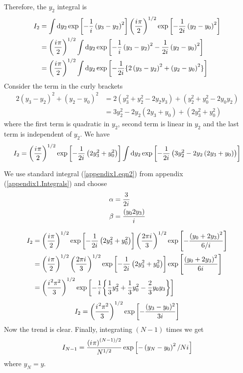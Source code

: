 	Therefore, the $y_2$ integral is
	\begin{align*}
		I_2 
		&= \int \dd{y_2} \exp \left[-\frac{1}{{i\mkern1mu}} \left(y_3 - y_2\right)^2\right] \left(\frac{{i\mkern1mu} \pi}{2}\right)^{1/2} \exp \left[-\frac{1}{2 {i\mkern1mu}} \left(y_2 - y_0\right)^2\right] \\
		&= \left(\frac{{i\mkern1mu} \pi}{2}\right)^{1/2} \int \dd{y_2} \exp \left[-\frac{1}{{i\mkern1mu}} \left(y_3 - y_2\right)^2 -\frac{1}{2 {i\mkern1mu}} \left(y_2 - y_0\right)^2\right] \\
		&= \left(\frac{{i\mkern1mu} \pi}{2}\right)^{1/2} \int \dd{y_2} \exp \left[-\frac{1}{2{i\mkern1mu}} \{2 \left(y_3 - y_2\right)^2 + \left(y_2 - y_0\right)^2\}\right] \\
	\end{align*}
	Consider the term in the curly brackets
	\begin{align*}
		2\left(y_3 - y_2\right)^2 + \left(y_2 - y_0\right)^2 &= 2\left(y_3^2 + y_2^2 - 2y_2 y_3\right) + \left(y_2^2 + y_0^2 - 2 y_0 y_2\right) \\
		&= 3 y_2^2 - 2y_2 \left(2y_3 + y_0\right) + \left(2 y_3^2 + y_0^2\right)
	\end{align*}
	where the first term is quadratic in $y_2$, second term is linear in $y_2$ and the last term is independent of $y_2$. We have
	\begin{equation}
		I_2 = \left(\frac{{i\mkern1mu} \pi}{2}\right)^{1/2} \exp\left[-\frac{1}{2{i\mkern1mu}}\left(2 y_3^2 + y_0^2\right)\right] \int \dd{y_2} \exp\left[-\frac{1}{2{i\mkern1mu}} \left(3 y_2^2 - 2y_2 \left(2 y_3 + y_0\right)\right) \right]
	\end{equation}
	
	We use standard integral (\ref{appendix1.eqn2}) from appendix (\ref{appendix1.Integrals}) and choose
	\begin{align}
		\alpha &= \frac{3}{2{i\mkern1mu}} \\
		\beta &= \frac{\left(y_0 2 y_3\right)}{{i\mkern1mu}}
	\end{align}
	
	\begin{align*}
		I_2 
		&= \left(\frac{{i\mkern1mu} \pi}{2}\right)^{1/2} \exp\left[-\frac{1}{2{i\mkern1mu}} \left(2 y_3^2 + y_0^2\right)\right] \left(\frac{2\pi {i\mkern1mu}}{3}\right)^{1/2} \exp\left[-\frac{\left(y_0 + 2 y_3\right)^2}{6/{i\mkern1mu}}\right] \\
		&= \left(\frac{{i\mkern1mu} \pi}{2}\right)^{1/2} \left(\frac{2\pi {i\mkern1mu}}{3}\right)^{1/2}  \exp\left[-\frac{1}{2{i\mkern1mu}} \left(2 y_3^2 + y_0^2\right)\right]  \exp\left[\frac{\left(y_0 + 2 y_3\right)^2}{6{i\mkern1mu}}\right] \\
		&= \qty(\frac{{i\mkern1mu}^2 \pi^2}{3})^{1/2} \exp\left[-\frac{1}{{i\mkern1mu}}\qty{\frac{1}{3} y_3^2 + \frac{1}{3} y_0^2 -\frac{2}{3} y_0 y_3}\right]
	\end{align*}
	\begin{equation}
		I_2 = \qty(\frac{{i\mkern1mu}^2 \pi^2}{3})^{1/2} \exp\left[-\frac{(y_3-y_0)^2}{3{i\mkern1mu}}\right]
		\label{chapter12.eqn17-path-integral-free-particle}
	\end{equation}
	Now the trend is clear. Finally, integrating $(N-1)$ times we get
	\begin{equation}
		I_{N-1} = \frac{\left({i\mkern1mu} \pi\right)^{(N-1)/2}}{N^{1/2}} \exp\left[-\left(y_N - y_0\right)^2/N{i\mkern1mu}
		\right]
	\end{equation}
	where $y_N = y$.

